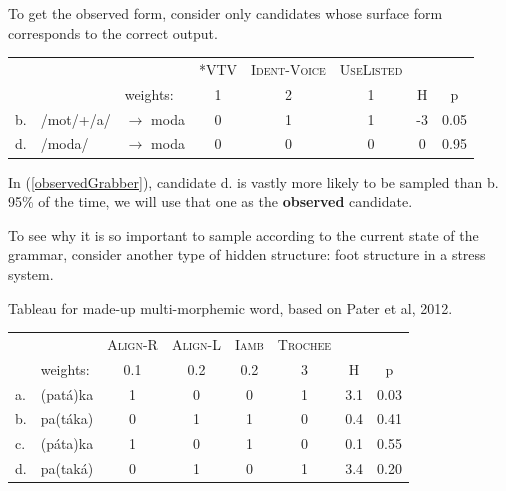 \documentclass[12]{article}
\begin{document}
	  \begin{exe}
	  	\ex\label{observedGrabber} To get the observed form, consider only candidates whose surface form corresponds to the correct output.
	  	
	  	\begin{tabular}{lll|ccc|cc}
	  		
	  		& &                  &\textsc{*VTV} & \textsc{Ident-Voice} & \textsc{UseListed} &   &  \\
	  		& &       weights:    &  1  &  2          &   1       & H & p \\  
	  		\hline 
	  		
	  		b.& /mot/+/a/& $\rightarrow$ moda &  0  &  1          &   1       & -3&0.05\\
	  		d.& /moda/   & $\rightarrow$ moda &  0  &  0          &   0       & 0 &0.95\\
	  		
	  	\end{tabular}
	  	
	  \end{exe}
  
  	In (\ref{observedGrabber}), candidate d. is vastly more likely to be sampled than b.  95\% of the time, we will use that one as the {\bf observed} candidate.
  	
  	To see why it is so important to sample according to the current state of the grammar, consider another type of hidden structure: foot structure in a stress system.
  	
  	\begin{exe}
  	\ex\label{stressHiddenStructureTab} Tableau for made-up multi-morphemic word, based on Pater et al, 2012.
  	
  	\begin{tabular}{ll|cccc|cc}
  		
  		 &                  &\textsc{Align-R} 	& \textsc{Align-L} 	& \textsc{Iamb}	& \textsc{Trochee} 	&     &   \\
  		 &       weights:   &		0.1			&		0.2			&		0.2		&		3			& H   & p \\  
  		\hline 
  		a. & (pat\'{a})ka 	&		1			&		0			&		0		&		1			& 3.1 & 0.03 \\
  		b. & pa(t\'{a}ka)   &		0			&		1			&		1		&		0			& 0.4 &	0.41 \\
  		c. & (p\'{a}ta)ka   &		1			&		0			&		1		&		0			& 0.1 &	0.55 \\
  		d. & pa(tak\'{a})	&		0			&		1			&		0		&		1			& 3.4 &	0.20 \\
  	\end{tabular}
  	
  \end{exe}	
\end{document}
